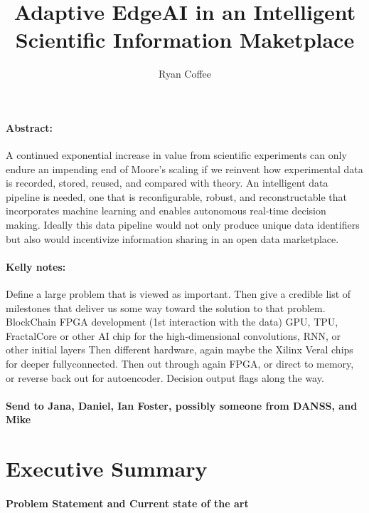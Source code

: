 \documentclass{article}
\title{Adaptive EdgeAI in an Intelligent Scientific Information Maketplace}
\author{Ryan Coffee}
\begin{document}
\maketitle

\paragraph{Abstract:} %
A continued exponential increase in value from scientific experiments can only endure an impending end of Moore's scaling if we reinvent how experimental data is recorded, stored, reused, and compared with theory.
An intelligent data pipeline is needed, one that is reconfigurable, robust, and reconstructable that incorporates machine learning and enables autonomous real-time decision making.
Ideally this data pipeline would not only produce unique data identifiers but also would incentivize information sharing in an open data marketplace.


\paragraph{Kelly notes:}
Define a large problem that is viewed as important.
Then give a credible list of milestones that deliver us some way toward the solution to that problem.
BlockChain
FPGA development (1st interaction with the data)
GPU, TPU, FractalCore or other AI chip for the high-dimensional convolutions, RNN, or other initial layers
Then different hardware, again maybe the Xilinx Veral chips for deeper fullyconnected.
Then out through again FPGA, or direct to memory, or reverse back out for autoencoder.
Decision output flags along the way.


\paragraph{Send to Jana, Daniel, Ian Foster, possibly someone from DANSS, and Mike}

\section{Executive Summary}
\paragraph{Problem Statement and Current state of the art}
\end{document}
